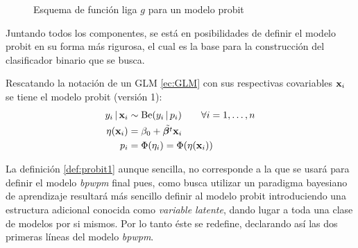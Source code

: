 \documentclass[../Main/Main.tex]{subfiles}
\begin{document}
\begin{figure}[h]
\centering
{}
\caption{Esquema de función liga $g$ para un modelo probit}
\label{fig:DiagramaFuncLiga}
\end{figure}

Juntando todos los componentes, se está en posibilidades de definir el modelo probit en su forma más rigurosa, el cual es la base para la construcción del clasificador binario que se busca.
\vfill
\pagebreak

\begin{definition} Rescatando la notación de un GLM \eqref{ec:GLM} con sus respectivas covariables $\mathbf{x}_i$ se tiene el modelo probit (versión 1): \label{def:probit1}
\begin{align}
y_i\,|\,\mathbf{x}_i & \sim \text{Be}(y_i\,|\,p_i) \qquad \forall i = 1,\ldots,n\label{ec:ModProbitA}\\
\eta(\mathbf{x}_i) &= \beta_0 + \tilde{\bm{\beta}^t}\mathbf{x}_i \label{ec:ModProbitB} \\
p_i &= \Phi(\eta_i) = \Phi(\eta(\mathbf{x}_i)) \label{ec:ModProbitC}
\end{align}
\end{definition}
La definición \ref{def:probit1} aunque sencilla, no corresponde a la que se usará para definir el modelo \textit{bpwpm} final pues, como busca utilizar un paradigma bayesiano de aprendizaje resultará más sencillo definir al modelo probit introduciendo una estructura adicional conocida como \textit{variable latente}, dando lugar a toda una clase de modelos por si mismos. Por lo tanto éste se redefine, declarando así las dos primeras líneas del modelo \textit{bpwpm}.\\
\end{document}
